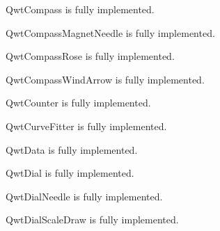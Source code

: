 \documentclass[a4paper,10pt,english]{manual}
\begin{document}
\hypertarget{PyQt4.Qwt5.QwtCompass}{}\begin{classdesc}{QwtCompass}{}
is fully implemented.
\end{classdesc}

\hypertarget{PyQt4.Qwt5.QwtCompassMagnetNeedle}{}\begin{classdesc}{QwtCompassMagnetNeedle}{}
is fully implemented.
\end{classdesc}

\hypertarget{PyQt4.Qwt5.QwtCompassRose}{}\begin{classdesc}{QwtCompassRose}{}
is fully implemented.
\end{classdesc}

\hypertarget{PyQt4.Qwt5.QwtCompassWindArrow}{}\begin{classdesc}{QwtCompassWindArrow}{}
is fully implemented.
\end{classdesc}

\hypertarget{PyQt4.Qwt5.QwtCounter}{}\begin{classdesc}{QwtCounter}{}
is fully implemented.
\end{classdesc}

\hypertarget{PyQt4.Qwt5.QwtCurveFitter}{}\begin{classdesc}{QwtCurveFitter}{}
is fully implemented.
\end{classdesc}

\hypertarget{PyQt4.Qwt5.QwtData}{}\begin{classdesc}{QwtData}{}
is fully implemented.
\end{classdesc}

\hypertarget{PyQt4.Qwt5.QwtDial}{}\begin{classdesc}{QwtDial}{}
is fully implemented.
\end{classdesc}

\hypertarget{PyQt4.Qwt5.QwtDialNeedle}{}\begin{classdesc}{QwtDialNeedle}{}
is fully implemented.
\end{classdesc}

\hypertarget{PyQt4.Qwt5.QwtDialScaleDraw}{}\begin{classdesc}{QwtDialScaleDraw}{}
is fully implemented.
\end{classdesc}
\end{document}

